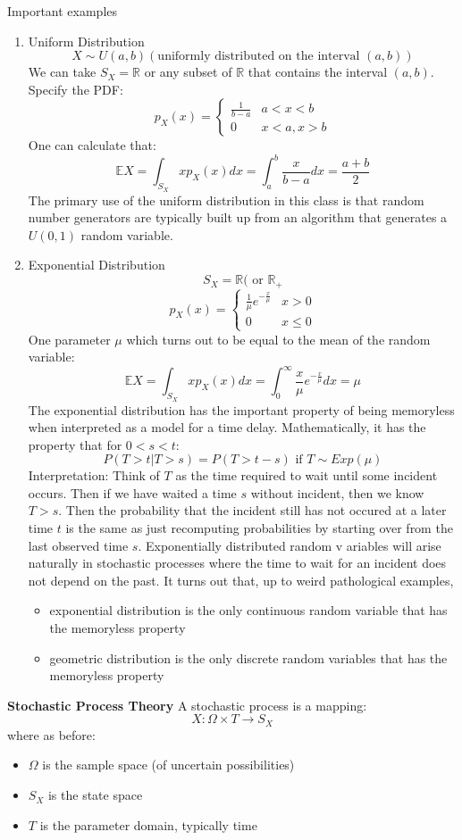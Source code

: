 \documentclass[12pt]{article}
\numberwithin{equation}{section}
\begin{document}
Important examples
\begin{enumerate}
\item Uniform Distribution
    $$X\sim U(a,b)(\text{uniformly distributed on the interval }(a,b))$$
    We can take $S_X=\mathbb{R}$ or any subset of $\mathbb{R}$ that contains the interval $(a,b)$. Specify the PDF:
    $$p_X(x)=\left\{\begin{array}{cc}\frac{1}{b-a} & a<x<b\\0&x<a,x>b\end{array}\right.$$
    One can calculate that:
    $$\mathbb{E}X=\int_{S_X}xp_X(x)dx=\int_a^b\frac{x}{b-a}dx=\frac{a+b}{2}$$
    The primary use of the uniform distribution in this class is that random number generators are typically built up from an algorithm that generates a $U(0,1)$ random variable.
\item Exponential Distribution
    $$S_X=\mathbb{R}(\text{ or }\mathbb{R}_+$$
    $$p_X(x)=\left\{\begin{array}{cc}\frac{1}{\mu}e^{-\frac{x}{\mu}}&x>0\\0&x\leq 0\end{array}\right.$$
    One parameter $\mu$ which turns out to be equal to the mean of the random variable:
    $$\mathbb{E}X=\int_{S_X}xp_X(x)dx=\int_0^\infty \frac{x}{\mu}e^{-\frac{x}{\mu}}dx=\mu$$
    The exponential distribution has the important property of being memoryless when interpreted as a model for a time delay. Mathematically, it has the property that for $0<s<t$:
    $$P(T>t|T>s)=P(T>t-s)\text{ if }T\sim Exp(\mu)$$
    Interpretation: Think of $T$ as the time required to wait until some incident occurs. Then if we have waited a time $s$ without incident, then we know $T>s$. Then the probability that the incident still has not occured at a later time $t$ is the same as just recomputing probabilities by starting over from the last observed time $s$. Exponentially distributed random v ariables will arise naturally in stochastic processes where the time to wait for an incident does not depend on the past. It turns out that, up to weird pathological examples,
    \begin{itemize}
    \item exponential distribution is the only continuous random variable that has the memoryless property
    \item geometric distribution is the only discrete random variables that has the memoryless property
    \end{itemize}
      
\end{enumerate}
\pagebreak

\textbf{Stochastic Process Theory}
A stochastic process is a mapping:
$$X:\Omega\times T\to S_X$$
where as before:
\begin{itemize}
\item $\Omega$ is the sample space (of uncertain possibilities)
\item $S_X$ is the state space
\item $T$ is the parameter domain, typically time
\end{itemize}
\end{document}
